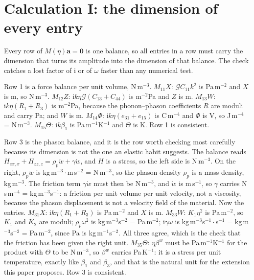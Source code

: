 \documentclass[11pt]{article}
\makeatletter
\newif\ifshowworked
\newenvironment{worked}{%
  \ifshowworked\par\smallskip\noindent\textit{Working.}\par\smallskip\else
  \setbox\z@\vbox\bgroup\fi}{\ifshowworked\par\smallskip\else\egroup\fi}
\newcommand{\ii}{\mathrm{i}}
\newcommand{\Gcal}{\mathcal{G}}
\makeatother
\begin{document}
\section{Calculation I: the dimension of every entry}

Every row of $M(\eta)\mathbf a=\mathbf 0$ is one balance, so all entries in a row must carry the dimension
that turns its amplitude into the dimension of that balance. The check catches a lost factor of $\ii$ or of
$\omega$ faster than any numerical test.

\begin{worked}
Row 1 is a force balance per unit volume, N\,m$^{-3}$. $M_{11}X$: $\Gcal C_{11}k^2$ is Pa\,m$^{-2}$ and $X$
is m, so N\,m$^{-3}$. $M_{12}Z$: $\ii k\eta\Gcal(C_{13}+C_{44})$ is m$^{-2}$Pa and $Z$ is m.
$M_{13}W$: $\ii k\eta(R_1+R_3)$ is m$^{-2}$Pa, because the phonon--phason coefficients $R$ are moduli and
carry Pa; and $W$ is m. $M_{14}\Phi$: $\ii k\eta(e_{31}+e_{15})$ is C\,m$^{-4}$ and $\Phi$ is V, so
J\,m$^{-4}$ = N\,m$^{-3}$. $M_{15}\Theta$: $\ii k\beta_1$ is Pa\,m$^{-1}$K$^{-1}$ and $\Theta$ is K. Row 1
is consistent.
\end{worked}

\begin{worked}
Row 3 is the phason balance, and it is the row worth checking most carefully because its dimension is not
the one an elastic habit suggests. The balance reads
$H_{zx,x}+H_{zz,z}=\rho_p\ddot w+\gamma\dot w$, and $H$ is a stress, so the left side is N\,m$^{-3}$. On
the right, $\rho_p\ddot w$ is kg\,m$^{-3}\cdot$m\,s$^{-2}$ = N\,m$^{-3}$, so the phason density $\rho_p$ is
a mass density, kg\,m$^{-3}$. The friction term $\gamma\dot w$ must then be N\,m$^{-3}$, and $\dot w$ is
m\,s$^{-1}$, so $\gamma$ carries N\,s\,m$^{-4}$ = kg\,m$^{-3}$s$^{-1}$: a friction per unit volume per unit
velocity, not a viscosity, because the phason displacement is not a velocity field of the material.
Now the entries. $M_{31}X$: $\ii k\eta(R_1+R_3)$ is Pa\,m$^{-2}$ and $X$ is m.
$M_{33}W$: $K_1\eta^2$ is Pa\,m$^{-2}$, so $K_1$ and $K_2$ are moduli; $\rho_p\omega^2$ is
kg\,m$^{-3}$s$^{-2}$ = Pa\,m$^{-2}$; $\ii\gamma\omega$ is kg\,m$^{-3}$s$^{-1}\cdot$s$^{-1}$ = kg\,m$^{-3}$s$^{-2}$ = Pa\,m$^{-2}$,
since Pa is kg\,m$^{-1}$s$^{-2}$. All three agree, which is the check that the friction has been given the right unit.
$M_{35}\Theta$: $\eta\beta^{w}$ must be Pa\,m$^{-1}$K$^{-1}$ for the product with $\Theta$ to be
N\,m$^{-3}$, so $\beta^{w}$ carries Pa\,K$^{-1}$: it is a stress per unit temperature, exactly like
$\beta_1$ and $\beta_3$, and that is the natural unit for the extension this paper proposes. Row 3 is
consistent.
\end{worked}
\end{document}
